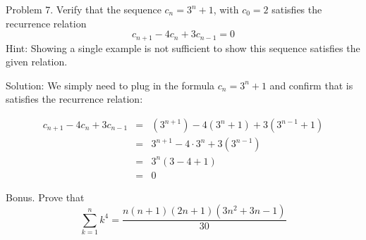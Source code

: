 \documentclass[16 pt]{amsart}
\theoremstyle{definition}
\theoremstyle{remark}
\numberwithin{equation}{subsection}
\begin{document}
\newpage

Problem 7.
Verify that the sequence $c_n = 3^n +1$, with $c_0=2$ satisfies the recurrence relation
\[
c_{n+1} - 4 c_n + 3c_{n-1}=0
\]
Hint: Showing a single example is not sufficient to show this sequence satisfies the given relation.

\vspace{1in}

Solution: We simply need to plug in the formula $c_n=3^n+1$ and confirm that is satisfies the recurrence relation:

\begin{eqnarray*}
c_{n+1} - 4c_n + 3c_{n-1} &  = & (3^{n+1})-4(3^n+1) + 3(3^{n-1}+1)\\
& = & 3^{n+1} - 4\cdot 3^n + 3(3^{n-1})\\
& = & 3^{n}(3-4+1)\\
& = & 0
\end{eqnarray*}

\newpage
Bonus.
Prove that 
\[
\sum_{k=1}^{n} k^4 = \frac{n(n+1)(2n+1)(3n^2+3n-1)}{30}
\]
\end{document}
